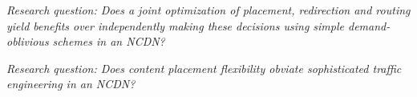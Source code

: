 \emph{Research question: Does a joint optimization of placement, redirection and routing yield benefits over independently making these decisions using simple demand-oblivious schemes in an NCDN?}

\emph{Research question: Does content placement flexibility obviate sophisticated traffic engineering in an NCDN?}




%
%





